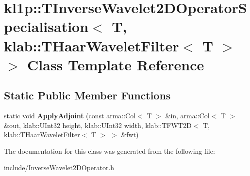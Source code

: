 \hypertarget{classkl1p_1_1TInverseWavelet2DOperatorSpecialisation_3_01T_00_01klab_1_1THaarWaveletFilter_3_01T_01_4_01_4}{}\section{kl1p\+:\+:T\+Inverse\+Wavelet2\+D\+Operator\+Specialisation$<$ T, klab\+:\+:T\+Haar\+Wavelet\+Filter$<$ T $>$ $>$ Class Template Reference}
\label{classkl1p_1_1TInverseWavelet2DOperatorSpecialisation_3_01T_00_01klab_1_1THaarWaveletFilter_3_01T_01_4_01_4}
\subsection*{Static Public Member Functions}
\begin{DoxyCompactItemize}
\item 
static void {\bfseries Apply\+Adjoint} (const arma\+::\+Col$<$ T $>$ \&in, arma\+::\+Col$<$ T $>$ \&out, klab\+::\+U\+Int32 height, klab\+::\+U\+Int32 width, klab\+::\+T\+F\+W\+T2D$<$ T, klab\+::\+T\+Haar\+Wavelet\+Filter$<$ T $>$ $>$ \&fwt)\hypertarget{classkl1p_1_1TInverseWavelet2DOperatorSpecialisation_3_01T_00_01klab_1_1THaarWaveletFilter_3_01T_01_4_01_4_add3a2a3f13a20c202df32178772f5dee}{}\label{classkl1p_1_1TInverseWavelet2DOperatorSpecialisation_3_01T_00_01klab_1_1THaarWaveletFilter_3_01T_01_4_01_4_add3a2a3f13a20c202df32178772f5dee}

\end{DoxyCompactItemize}


The documentation for this class was generated from the following file\+:\begin{DoxyCompactItemize}
\item 
include/Inverse\+Wavelet2\+D\+Operator.\+h\end{DoxyCompactItemize}
